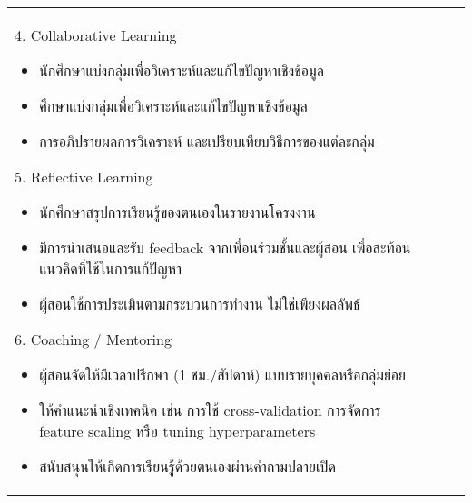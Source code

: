 {\begin{center}
\begin{longtable}{|p{}|p{}|p{}|>{\raggedcolumns}p{}|}
	4. Collaborative Learning
	\begin{itemize}
		\item นักศึกษาแบ่งกลุ่มเพื่อวิเคราะห์และแก้ไขปัญหาเชิงข้อมูล
		\item ศึกษาแบ่งกลุ่มเพื่อวิเคราะห์และแก้ไขปัญหาเชิงข้อมูล
		\item การอภิปรายผลการวิเคราะห์ และเปรียบเทียบวิธีการของแต่ละกลุ่ม
	\end{itemize}
	5. Reflective Learning
	\begin{itemize}
		\item นักศึกษาสรุปการเรียนรู้ของตนเองในรายงานโครงงาน
		\item มีการนำเสนอและรับ feedback จากเพื่อนร่วมชั้นและผู้สอน เพื่อสะท้อนแนวคิดที่ใช้ในการแก้ปัญหา
		\item ผู้สอนใช้การประเมินตามกระบวนการทำงาน ไม่ใช่เพียงผลลัพธ์
	\end{itemize}	
6. Coaching / Mentoring
	\begin{itemize}
		\item ผู้สอนจัดให้มีเวลาปรึกษา (1 ชม./สัปดาห์) แบบรายบุคคลหรือกลุ่มย่อย
		\item ให้คำแนะนำเชิงเทคนิค เช่น การใช้ cross-validation การจัดการ feature scaling หรือ tuning hyperparameters
		\item สนับสนุนให้เกิดการเรียนรู้ด้วยตนเองผ่านคำถามปลายเปิด
	\end{itemize}


\end{longtable}
\end{center}}
